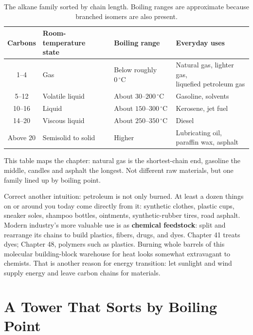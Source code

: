 \begin{table}[h]
\centering
\begin{tabular}{clll}
\toprule
Carbons & \shortstack[l]{Room-temperature\\state} & Boiling range & Everyday uses \\
\midrule
1--4 & Gas & \shortstack[l]{Below roughly\\$0\,^{\circ}\mathrm{C}$} & \shortstack[l]{Natural gas, lighter gas,\\liquefied petroleum gas} \\
5--12 & Volatile liquid & About $30$--$200\,^{\circ}\mathrm{C}$ & Gasoline, solvents \\
10--16 & Liquid & About $150$--$300\,^{\circ}\mathrm{C}$ & Kerosene, jet fuel \\
14--20 & Viscous liquid & About $250$--$350\,^{\circ}\mathrm{C}$ & Diesel \\
Above 20 & Semisolid to solid & Higher & \shortstack[l]{Lubricating oil,\\paraffin wax, asphalt} \\
\bottomrule
\end{tabular}
\caption{The alkane family sorted by chain length. Boiling ranges are approximate because branched isomers are also present.}
\end{table}

This table maps the chapter: natural gas is the shortest-chain end, gasoline the middle, candles and asphalt the longest. Not different raw materials, but one family lined up by boiling point.

Correct another intuition: petroleum is not only burned. At least a dozen things on or around you today come directly from it: synthetic clothes, plastic cups, sneaker soles, shampoo bottles, ointments, synthetic-rubber tires, road asphalt. Modern industry's more valuable use is as \textbf{chemical feedstock}: split and rearrange its chains to build plastics, fibers, drugs, and dyes. Chapter 41 treats dyes; Chapter 48, polymers such as plastics. Burning whole barrels of this molecular building-block warehouse for heat looks somewhat extravagant to chemists. That is another reason for energy transition: let sunlight and wind supply energy and leave carbon chains for materials.

\section{A Tower That Sorts by Boiling Point}


